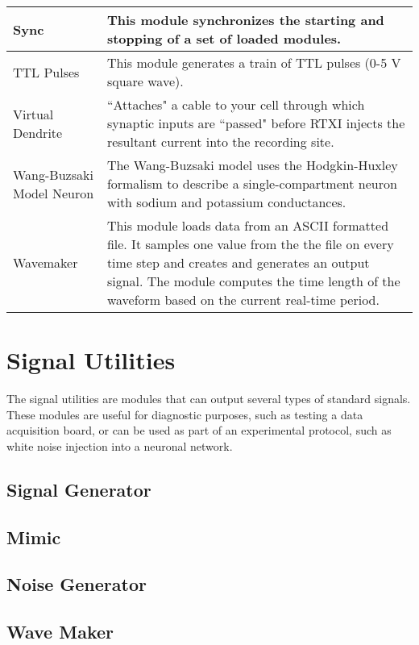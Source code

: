\begin{longtable}{| p{} | p{} |}
 Sync & This module synchronizes the starting and stopping of a set of loaded modules. \\\hline
 TTL Pulses & This module generates a train of TTL pulses (0-5 V square wave). \\\hline
 Virtual Dendrite & ``Attaches" a cable to your cell through which synaptic inputs are ``passed" before RTXI injects the resultant current into the recording site. \\\hline
 Wang-Buzsaki Model Neuron & The Wang-Buzsaki model uses the Hodgkin-Huxley formalism to describe a single-compartment neuron with sodium and potassium conductances. \\\hline
 Wavemaker & This module loads data from an ASCII formatted file. It samples one value from the the file on every time step and creates and generates an output signal. The module computes the time length of the waveform based on the current real-time period. \\\hline
\end{longtable}

\clearpage
\section{Signal Utilities}
\label{signalutilities}
The signal utilities are modules that can output several types of standard signals. These modules are useful for diagnostic purposes, such as testing a data acquisition board, or can be used as part of an experimental protocol, such as white noise injection into a neuronal network.

\subsection{Signal Generator}


\subsection{Mimic}


\subsection{Noise Generator}


\subsection{Wave Maker}


